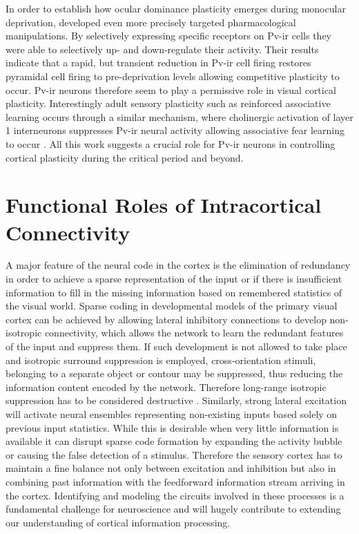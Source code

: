 In order to establish how ocular dominance plasticity emerges during
monocular deprivation, \cite{Kuhlman2013} developed even more
precisely targeted pharmacological manipulations. By selectively
expressing specific receptors on Pv-ir cells they were able to
selectively up- and down-regulate their activity. Their results
indicate that a rapid, but transient reduction in Pv-ir cell firing
restores pyramidal cell firing to pre-deprivation levels allowing
competitive plasticity to occur. Pv-ir neurons therefore seem to play
a permissive role in visual cortical plasticity. Interestingly adult
sensory plasticity such as reinforced associative learning occurs
through a similar mechanism, where cholinergic activation of layer 1
interneurons suppresses Pv-ir neural activity allowing associative
fear learning to occur \citep{Letzkus2011}. All this work suggests a
crucial role for Pv-ir neurons in controlling cortical plasticity
during the critical period and beyond.

\section{Functional Roles of Intracortical Connectivity}

A major feature of the neural code in the cortex is the elimination of
redundancy in order to achieve a sparse representation of the input or
if there is insufficient information to fill in the missing
information based on remembered statistics of the visual world. Sparse
coding in developmental models of the primary visual cortex can be
achieved by allowing lateral inhibitory connections to develop
non-isotropic connectivity, which allows the network to learn the
redundant features of the input and suppress them. If such development
is not allowed to take place and isotropic surround suppression is
employed, cross-orientation stimuli, belonging to a separate object or
contour may be suppressed, thus reducing the information content
encoded by the network. Therefore long-range isotropic suppression has
to be considered destructive \citep{Miikkulainen2005b}. Similarly,
strong lateral excitation will activate neural ensembles representing
non-existing inputs based solely on previous input statistics. While
this is desirable when very little information is available it can
disrupt sparse code formation by expanding the activity bubble or
causing the false detection of a stimulus. Therefore the sensory
cortex has to maintain a fine balance not only between excitation and
inhibition but also in combining past information with the feedforward
information stream arriving in the cortex. Identifying and modeling
the circuits involved in these processes is a fundamental challenge
for neuroscience and will hugely contribute to extending our
understanding of cortical information processing.

